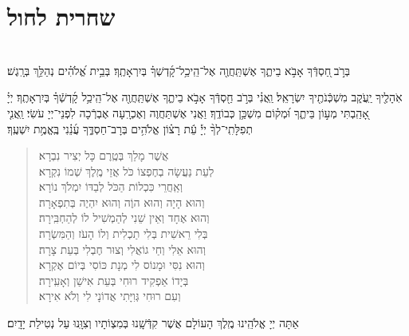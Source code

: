 \documentclass[twoside, openany, parskip=half, 11pt]{book}
\begin{document}
\vspace*{\fill}


\chapter[שחרית לחול]{ שחרית לחול } 


\setlength{\parskip}{0.75em}

\\
 	 
 	 בְּרֹ֣ב ֖חַסְדְּֿךָ אָבֹ֣א בֵיתֶ֑ךָ אֶשְׁתַּֽחֲוֶ֖ה אֶל־הֵֽיכַ֥ל־קָ֜דְשְׁךָ֗ בְּיִרְאָתֶֽךָ׃
בְּבֵ֥ית אֱ֝לֹהִ֗ים נְהַלֵּ֥ךְ בְּרָֽגֶשׁ׃
 	 

 אֹֽהָלֶ֖יךָ יַֽעֲֹק֑ב 	מִשְׁכְּֿנֹתֶ֖יךָ יִשְׂרָאֵֽל׃ 
 וַֽאֲנִ֗י בְּרֹ֣ב חַ֖סְדְּֿךָ אָבֹ֣א בֵיתֶ֑ךָ 
  אֶשְׁתַּֽחֲוֶ֖ה אֶל־הֵֽיכַ֥ל קָ֜דְשְֿׁךָ֗ 	בְּיִרְאָתֶֽךָ׃ 
 		יְיָ֗ ֖אָהַֽבְתִּי מְע֣וֹן בֵּיתֶ֑ךָ וּ֝מְק֗וֹם מִשְׁכַּ֥ן כְּבוֹדֶֽךָ׃  
 וַאֲנִי אֶשְׁתַּחֲוֶה וְאֶכְרָֽעָה אֶבְרְֿכָה לִפְנֵי־יְיָ עֹשִׂי׃ 
וַֽאֲנִ֤י
 תְפִלָּתִֽי־לְךָ֨ יְיָ֡ עֵ֬ת רָצ֗וֹן אֱלֹהִ֥ים בְּרָב־חַסְדֶּ֑ךָ עֲ֜נֵ֗נִי בֶּֽאֱמֶ֥ת יִשְׁעֶֽךָ׃


\begin{quote}

אֲשֶׁר מָלַךְ \hfill 	בְּטֶֽרֶם כָּל	יְצִיר נִבְרָא׃ \\
לְעֵת נַעֲשָׂה בְחֶפְצוֹ כֹּל \hfill אֲזַי מֶֽלֶךְ שְׁמוֹ נִקְרָא׃\\
וְאַֽחֲרֵי כִּכְלוֹת הַכֹּל \hfill לְבַדּוֹ יִמְלֹךְ נוֹרָא׃ \\
וְהוּא הָיָה וְהוּא הוֶֹה \hfill 	וְהוּא יִהְיֶה בְּתִפְאָרָה׃ \\
וְהוּא אֶחָד וְאֵין שֵׁנִי \hfill לְהַמְשִׁיל לוֹ לְהַחְבִּֽירָה׃ \\
בְּלִי רֵאשִׁית בְּלִי תַכְלִית \hfill וְלוֹ הָעֹז וְהַמִּשְׂרָה׃ \\
וְהוּא אֵלִי וְחַי גוֹאֲלִי \hfill וְצוּר חֶבְלִי בְּעֵת צָרָה׃ \\
וְהוּא נִסִּי  וּמָנוֹס לִי \hfill מְנָת כּוֹסִי בְּיוֹם אֶקְרָא׃ \\
בְּיָדוֹ אַפְקִיד רוּחִי \hfill בְּעֵת אִישַׁן וְאָעִֽירָה׃ \\
וְעִם רוּחִי גְּוִיָּתִי \hfill אֲדוֹנָי לִי וְלֹא אִירָא׃

\end{quote}

 אַתָּה יְיָ אֱלֹהֵֽינוּ מֶֽלֶךְ הָעוֹלָם אֲשֶׁר קִדְּֿשָֽׁנוּ בְּמִצְוֹתָיו וְצִוָּֽנוּ עַל נְטִילַת יָדָֽיִם׃
 
\end{document}
